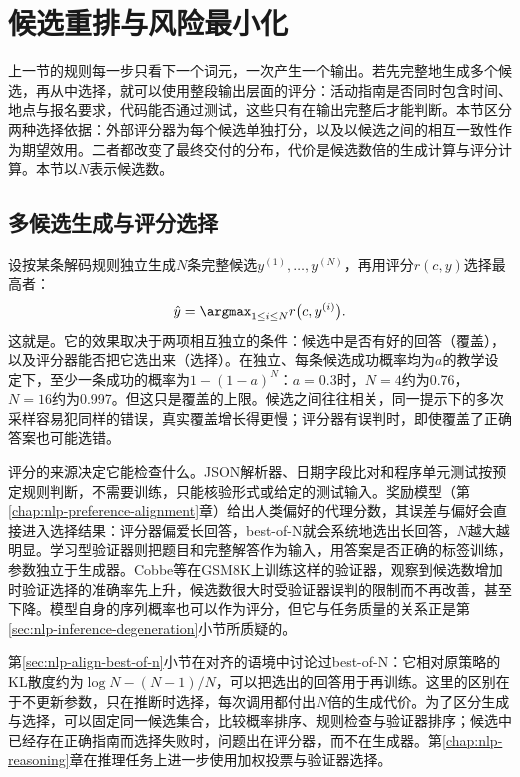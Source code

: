 \section{候选重排与风险最小化}
\label{sec:nlp-inference-verification}

上一节的规则每一步只看下一个词元，一次产生一个输出。若先完整地生成多个候选，再从中选择，就可以使用整段输出层面的评分：活动指南是否同时包含时间、地点与报名要求，代码能否通过测试，这些只有在输出完整后才能判断。本节区分两种选择依据：外部评分器为每个候选单独打分，以及以候选之间的相互一致性作为期望效用。二者都改变了最终交付的分布，代价是候选数倍的生成计算与评分计算。本节以$N$表示候选数。

\subsection{多候选生成与评分选择}
\label{sec:nlp-inference-reranking}

设按某条解码规则独立生成$N$条完整候选$y^{(1)},\ldots,y^{(N)}$，再用评分$r(c,y)$选择最高者：
\begin{equation}
 \hat y=\argmax_{1\leq i\leq N}r\bigl(c,y^{(i)}\bigr).
 \label{eq:nlp-inference-best-of-n}
\end{equation}
这就是。它的效果取决于两项相互独立的条件：候选中是否有好的回答（覆盖），以及评分器能否把它选出来（选择）。在独立、每条候选成功概率均为$a$的教学设定下，至少一条成功的概率为$1-(1-a)^N$：$a=0.3$时，$N=4$约为0.76，$N=16$约为0.997。但这只是覆盖的上限。候选之间往往相关，同一提示下的多次采样容易犯同样的错误，真实覆盖增长得更慢；评分器有误判时，即使覆盖了正确答案也可能选错。

评分的来源决定它能检查什么。JSON解析器、日期字段比对和程序单元测试按预定规则判断，不需要训练，只能核验形式或给定的测试输入。奖励模型（第\ref{chap:nlp-preference-alignment}章）给出人类偏好的代理分数，其误差与偏好会直接进入选择结果：评分器偏爱长回答，best-of-N就会系统地选出长回答，$N$越大越明显。学习型验证器则把题目和完整解答作为输入，用答案是否正确的标签训练，参数独立于生成器。Cobbe等在GSM8K上训练这样的验证器，观察到候选数增加时验证选择的准确率先上升，候选数很大时受验证器误判的限制而不再改善，甚至下降。模型自身的序列概率也可以作为评分，但它与任务质量的关系正是第\ref{sec:nlp-inference-degeneration}小节所质疑的。

第\ref{sec:nlp-align-best-of-n}小节在对齐的语境中讨论过best-of-N：它相对原策略的KL散度约为$\log N-(N-1)/N$，可以把选出的回答用于再训练。这里的区别在于不更新参数，只在推断时选择，每次调用都付出$N$倍的生成代价。为了区分生成与选择，可以固定同一候选集合，比较概率排序、规则检查与验证器排序；候选中已经存在正确指南而选择失败时，问题出在评分器，而不在生成器。第\ref{chap:nlp-reasoning}章在推理任务上进一步使用加权投票与验证器选择。

